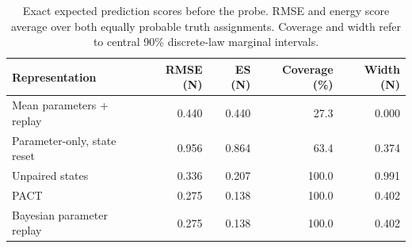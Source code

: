 \begin{table}[ht]
\centering\small
\caption{Exact expected prediction scores before the probe. RMSE and energy score average over both equally probable truth assignments. Coverage and width refer to central 90\% discrete-law marginal intervals.}
\label{tab:transfer_initial}
\begin{tabular}{@{}lrrrr@{}}
\toprule
Representation & RMSE (N) & ES (N) & Coverage (\%) & Width (N) \\
\midrule
Mean parameters + replay & 0.440 & 0.440 & 27.3 & 0.000 \\
Parameter-only, state reset & 0.956 & 0.864 & 63.4 & 0.374 \\
Unpaired states & 0.336 & 0.207 & 100.0 & 0.991 \\
PACT & 0.275 & 0.138 & 100.0 & 0.402 \\
Bayesian parameter replay & 0.275 & 0.138 & 100.0 & 0.402 \\
\bottomrule
\end{tabular}
\end{table}
